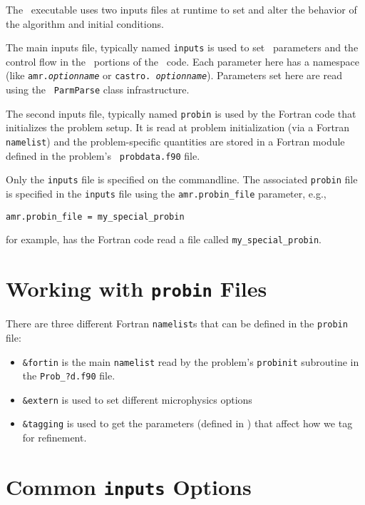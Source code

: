 The \castro\ executable uses two inputs files at runtime to set and alter the
behavior of the algorithm and initial conditions.

The main inputs file, typically named {\tt inputs}
is used to set \boxlib\ parameters and the control flow in the
\cpp\ portions of the \castro\ code.  Each parameter here has a
namespace (like {\tt amr.{\em optionname}} or {\tt castro.{\em
    optionname}}).  Parameters set here are read using the
\boxlib\ {\tt ParmParse} class infrastructure.

The second inputs file, typically named {\tt probin} is used by the Fortran code that initializes the problem
setup.  It is read at problem initialization (via a Fortran {\tt
  namelist}) and the problem-specific quantities are stored in a
Fortran module  defined in the problem's {\tt
  probdata.f90} file.

Only the {\tt inputs} file is specified on the commandline.  The
associated {\tt probin} file is specified in the {\tt inputs} file
using the {\tt amr.probin\_file} parameter, e.g.,
\begin{lstlisting}
amr.probin_file = my_special_probin
\end{lstlisting}
for example, has the Fortran code read a file called {\tt my\_special\_probin}.

\section{Working with {\tt probin} Files}

There are three different Fortran {\tt namelist}s that can be defined in the
{\tt probin} file:
\begin{itemize}
\item {\tt \&fortin} is the main {\tt namelist} read by the problem's {\tt probinit}
subroutine in the {\tt Prob\_?d.f90} file.

\item {\tt \&extern} is used to set different microphysics options

\item {\tt \&tagging} is used to get the parameters (defined in )
that affect how we tag for refinement.
\end{itemize}

\section{Common {\tt inputs} Options}

